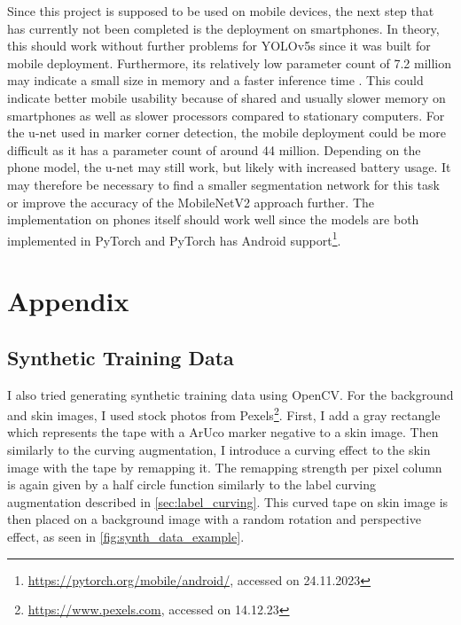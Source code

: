 \documentclass[10pt]{book}
\newcommand{\figureref}[1]{\autoref{#1}}
\begin{document}

Since this project is supposed to be used on mobile devices, the next step that has currently not been completed is the deployment on smartphones. In theory, this should work without further problems for \ac{YOLO}v5s since it was built for mobile deployment. Furthermore, its relatively low parameter count of 7.2 million may indicate a small size in memory and a faster inference time \cite{wang2023yolov7}. This could indicate better mobile usability because of shared and usually slower memory on smartphones as well as slower processors compared to stationary computers. For the u-net used in marker corner detection, the mobile deployment could be more difficult as it has a parameter count of around 44 million. Depending on the phone model, the u-net may still work, but likely with increased battery usage. It may therefore be necessary to find a smaller segmentation network for this task or improve the accuracy of the MobileNetV2 approach further. The implementation on phones itself should work well since the models are both implemented in PyTorch and PyTorch has Android support\footnote{\url{https://pytorch.org/mobile/android/}, accessed on 24.11.2023}.


\chapter{Appendix}

\section{Synthetic Training Data}
\label{sec:synth_data}

I also tried generating synthetic training data using OpenCV. For the background and skin images, I used stock photos from Pexels\footnote{\url{https://www.pexels.com}, accessed on 14.12.23}. First, I add a gray rectangle which represents the tape with a \ac{ArUco} marker negative to a skin image. Then similarly to the curving augmentation, I introduce a curving effect to the skin image with the tape by remapping it. The remapping strength per pixel column is again given by a half circle function similarly to the label curving augmentation described in \autoref{sec:label_curving}. This curved tape on skin image is then placed on a background image with a random rotation and perspective effect, as seen in \figureref{fig:synth_data_example}.
\end{document}
